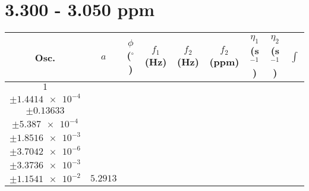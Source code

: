 \documentclass[8pt]{article}
\begin{document}
\section*{3.300 - 3.050 ppm}
\begin{longtable}[l]{c c c c c c c c c}
\toprule
Osc. & $a$ & $\phi$ ($^{\circ}$) & $f_1$ (Hz) & $f_2$ (Hz) & $f_2$ (ppm) & $\eta_1$ (s$^{-1}$) & $\eta_2$ (s$^{-1}$) & $\int$\\
\midrule
$\num{1}$ & \begin{tabular}[c]{@{}c@{}}$\num{6.0817e-2}$ \\ $\pm\num{1.4414e-4}$\end{tabular} & \begin{tabular}[c]{@{}c@{}}$\num{-0.67764}$ \\ $\pm\num{0.13633}$\end{tabular} & \begin{tabular}[c]{@{}c@{}}$\num{-10.342}$ \\ $\pm\num{5.387e-4}$\end{tabular} & \begin{tabular}[c]{@{}c@{}}$\num{1.5555e+3}$ \\ $\pm\num{1.8516e-3}$\end{tabular} & \begin{tabular}[c]{@{}c@{}}$\num{3.1118}$ \\ $\pm\num{3.7042e-6}$\end{tabular} & \begin{tabular}[c]{@{}c@{}}$\num{1.1769}$ \\ $\pm\num{3.3736e-3}$\end{tabular} & \begin{tabular}[c]{@{}c@{}}$\num{4.229}$ \\ $\pm\num{1.1541e-2}$\end{tabular} & $\num{5.2913}$\\

\end{longtable}
\end{document}
